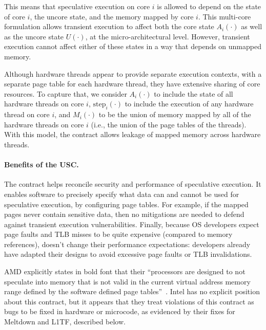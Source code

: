 This means that speculative execution on core $i$ is allowed to depend on
the state of core $i$, the uncore state, and the memory mapped by core
$i$.  This multi-core formulation allows transient execution to affect
both the core state $A_i(\cdot)$ as well as the uncore state $U(\cdot)$,
at the micro-architectural level.  However, transient execution cannot
affect either of these states in a way that depends on unmapped memory.

Although hardware threads appear to provide separate execution
contexts, with a separate page table for each hardware thread, they
have extensive sharing of core resources.  To capture that, we consider
$A_i(\cdot)$ to include the state of all hardware threads on core $i$,
$\textrm{step}_i(\cdot)$ to include the execution of any hardware thread
on core $i$, and $M_i(\cdot)$ to be the union of memory mapped by all
of the hardware threads on core $i$ (i.e., the union of the page tables
of the threads).  With this model, the contract allows leakage of mapped
memory across hardware threads.


\paragraph{Benefits of the USC.}

The contract helps reconcile security and performance of speculative
execution.  It enables software to precisely specify what data can and cannot
be used for speculative execution, by configuring page
tables.  For example, if the mapped pages never contain sensitive data,
then no mitigations are needed to defend against transient execution
vulnerabilities.  Finally,
because OS developers expect page faults and TLB misses to be quite
expensive (compared to memory references), \contract doesn't change
their performance expectations: developers already have adapted their
designs to avoid excessive page faults or TLB invalidations.


AMD explicitly states in bold font that
their ``processors are designed to not speculate into memory that is
not valid in the current virtual address memory range defined by the
software defined page tables''~\cite[pg. 2]{amd:speculation}.  Intel
has no explicit position about this contract, but it appears
that they treat violations of this contract as bugs to be fixed in
hardware or microcode, as evidenced by their fixes for Meltdown and
L1TF, described below.

